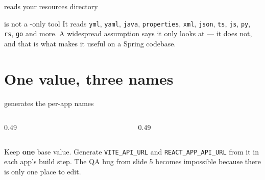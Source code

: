 \documentclass[aspectratio=169,10pt]{beamer}
\begin{document}
\begin{frame}[fragile]{ reads your resources directory}

  \vspace{0.4em}
  \begin{correction}{ is not a -only tool}
    It reads \texttt{yml}, \texttt{yaml}, \texttt{java}, \texttt{properties},
    \texttt{xml}, \texttt{json}, \texttt{ts}, \texttt{js}, \texttt{py},
    \texttt{rs}, \texttt{go} and more. A widespread assumption says it only
    looks at  --- it does not, and that is what makes it useful on a
    Spring codebase.
  \end{correction}
\end{frame}

\section{One value, three names}

\begin{frame}[fragile]{ generates the per-app names}
  \begin{columns}[T]
    \begin{column}{0.49\textwidth}
    \end{column}
    \begin{column}{0.49\textwidth}
    \end{column}
  \end{columns}

  \vspace{0.4em}
  {\footnotesize Keep \textbf{one} base value. Generate
  \texttt{VITE\_API\_URL} and \texttt{REACT\_APP\_API\_URL} from it in each
  app's build step. The QA bug from slide 5 becomes impossible because there is
  only one place to edit.}
\end{frame}
\end{document}

